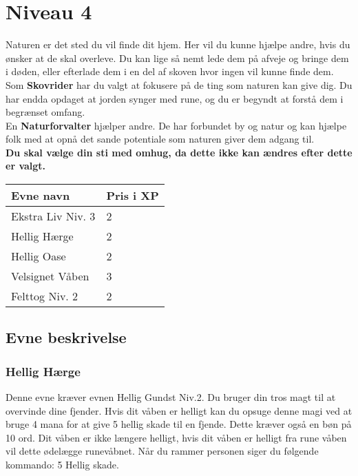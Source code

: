 \chapter{Niveau 4}
Naturen er det sted du vil finde dit hjem. Her vil du kunne hjælpe andre, hvis du ønsker at de skal overleve. Du kan lige så nemt lede dem på afveje og bringe dem i døden, eller efterlade dem i en del af skoven hvor ingen vil kunne finde dem.\\
Som \textbf{Skovrider} har du valgt at fokusere på de ting som naturen kan give dig. Du har endda opdaget at jorden synger med rune, og du er begyndt at forstå dem i begrænset omfang.\\ 
En \textbf{Naturforvalter} hjælper andre. De har forbundet by og natur og kan hjælpe folk med at opnå det sande potentiale som naturen giver dem adgang til.\\

\textbf{Du skal vælge din sti med omhug, da dette ikke kan ændres efter dette er valgt.}\\


\begin{table}[H]
    \centering
    \begin{tabular}{|p{}|p{}|}
    \rowcolor{cerulean!80}\hline
        Evne navn & Pris i XP \\\hline
        Ekstra Liv Niv. 3& 2\\\hline
        Hellig Hærge & 2 \\\hline
        Hellig Oase & 2 \\\hline
        Velsignet Våben & 3 \\\hline
        Felttog Niv. 2 & 2\\\hline
    \end{tabular}
\end{table}
\section{Evne beskrivelse}



\subsection{Hellig Hærge}
Denne evne kræver evnen Hellig Gundst Niv.2. Du bruger din tros magt til at overvinde dine fjender. Hvis dit våben er helligt kan du opsuge denne magi ved at bruge 4 mana for at give 5 hellig skade til en fjende. Dette kræver også en bøn på 10 ord. Dit våben er ikke længere helligt, hvis dit våben er helligt fra rune våben vil dette ødelægge runevåbnet. Når du rammer personen siger du følgende kommando: 5 Hellig skade.

